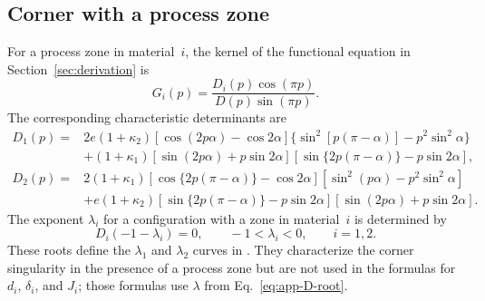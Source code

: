 \documentclass[pdflatex,onecolumn,sn-mathphys-ay]{sn-jnl}
\begin{document}
\subsection{Corner with a process zone}

For a process zone in material~$i$, the kernel of the functional equation
in Section~\ref{sec:derivation} is
\begin{equation*}
  G_i(p)=\frac{D_i(p)\cos(\pi p)}{D(p)\sin(\pi p)}.
\end{equation*}
The corresponding characteristic determinants are
\begin{equation}
\label{eq:app-post-zone-determinants}
\begin{aligned}
  D_1(p)={}&2e(1+\kappa_2)
  [\cos(2p\alpha)-\cos2\alpha]
  \{\sin^2[p(\pi-\alpha)]-p^2\sin^2\alpha\}\\
  &+(1+\kappa_1)
  [\sin(2p\alpha)+p\sin2\alpha]
  [\sin\{2p(\pi-\alpha)\}-p\sin2\alpha],\\[3pt]
  D_2(p)={}&2(1+\kappa_1)
  [\cos\{2p(\pi-\alpha)\}-\cos2\alpha]
  [\sin^2(p\alpha)-p^2\sin^2\alpha]\\
  &+e(1+\kappa_2)
  [\sin\{2p(\pi-\alpha)\}-p\sin2\alpha]
  [\sin(2p\alpha)+p\sin2\alpha].
\end{aligned}
\end{equation}
The exponent $\lambda_i$ for a configuration with a zone in
material~$i$ is determined by
\begin{equation}
\label{eq:app-post-zone-root}
  D_i(-1-\lambda_i)=0,
  \qquad -1<\lambda_i<0,
  \qquad i=1,2.
\end{equation}
These roots define the $\lambda_1$ and $\lambda_2$ curves in
\SingularityExponentFigure. They characterize the corner singularity in the
presence of a process zone but are not used in the formulas for $d_i$,
$\delta_i$, and $J_i$; those formulas use $\lambda$ from
Eq.~\eqref{eq:app-D-root}.



\end{document}
